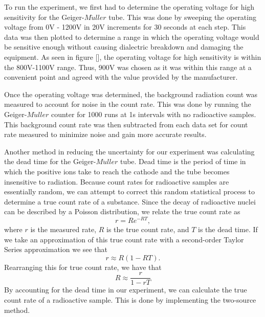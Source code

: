 \documentclass[longbibliography, 12pt]{article}
\begin{document}
	To run the experiment, we first had to determine the operating voltage for high sensitivity for the Geiger-$M\ddot{u}ller$ tube. This was done by sweeping the operating voltage from 0V - 1200V in 20V increments for 30 seconds at each step. This data was then plotted to determine a range in which the operating voltage would be sensitive enough without causing dialectric breakdown and damaging the equipment. As seen in figure [], the operating voltage for high sensitivity is within the 800V-1100V range. Thus, 900V was chosen as it was within this range at a convenient point and agreed with the value provided by the manufacturer.


	Once the operating voltage was determined, the background radiation count was measured to account for noise in the count rate. This was done by running the Geiger-$M\ddot{u}ller$ counter for 1000 runs at 1s intervals with no radioactive samples. This background count rate was then subtracted from each data set for count rate measured to minimize noise and gain more accurate results.

	Another method in reducing the uncertainty for our experiment was calculating the dead time for the Geiger-$M\ddot{u}ller$ tube. Dead time is the period of time in which the positive ions take to reach the cathode and the tube becomes insensitive to radiation. Because count rates for radioactive samples are essentially random, we can attempt to correct this random statistical process to determine a true count rate of a substance.  Since the decay of radioactive nuclei can be described by a Poisson distribution, we relate the true count rate as
\begin{equation}
r = Re^{-RT},
\label{eq:ActualCountRate}
\end{equation}
where $r$ is the measured rate, $R$ is the true count rate, and $T$ is the dead time. If we take an approximation of this true count rate with a second-order Taylor Series approximation we see that
\begin{equation}
r \approx R(1-RT).
\label{eq:ApproxCountRate}
\end{equation}
Rearranging this for true count rate, we have that
\begin{equation}
R \approx \frac{r}{1-rT}
\label{eq:TrueCountRate}
\end{equation}
	By accounting for the dead time in our experiment, we can calculate the true count rate of a radioactive sample. This is done by implementing the two-source method.
\end{document}
